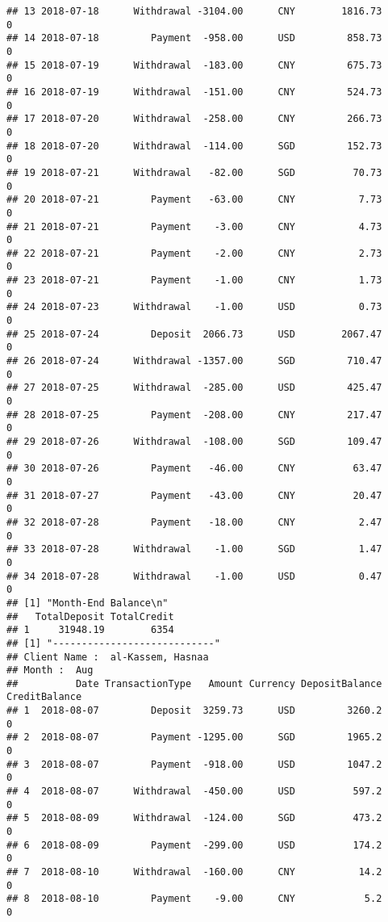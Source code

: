 \documentclass[]{article}
\begin{document}
\begin{verbatim}
## 13 2018-07-18      Withdrawal -3104.00      CNY        1816.73             0
## 14 2018-07-18         Payment  -958.00      USD         858.73             0
## 15 2018-07-19      Withdrawal  -183.00      CNY         675.73             0
## 16 2018-07-19      Withdrawal  -151.00      CNY         524.73             0
## 17 2018-07-20      Withdrawal  -258.00      CNY         266.73             0
## 18 2018-07-20      Withdrawal  -114.00      SGD         152.73             0
## 19 2018-07-21      Withdrawal   -82.00      SGD          70.73             0
## 20 2018-07-21         Payment   -63.00      CNY           7.73             0
## 21 2018-07-21         Payment    -3.00      CNY           4.73             0
## 22 2018-07-21         Payment    -2.00      CNY           2.73             0
## 23 2018-07-21         Payment    -1.00      CNY           1.73             0
## 24 2018-07-23      Withdrawal    -1.00      USD           0.73             0
## 25 2018-07-24         Deposit  2066.73      USD        2067.47             0
## 26 2018-07-24      Withdrawal -1357.00      SGD         710.47             0
## 27 2018-07-25      Withdrawal  -285.00      USD         425.47             0
## 28 2018-07-25         Payment  -208.00      CNY         217.47             0
## 29 2018-07-26      Withdrawal  -108.00      SGD         109.47             0
## 30 2018-07-26         Payment   -46.00      CNY          63.47             0
## 31 2018-07-27         Payment   -43.00      CNY          20.47             0
## 32 2018-07-28         Payment   -18.00      CNY           2.47             0
## 33 2018-07-28      Withdrawal    -1.00      SGD           1.47             0
## 34 2018-07-28      Withdrawal    -1.00      USD           0.47             0
## [1] "Month-End Balance\n"
##   TotalDeposit TotalCredit
## 1     31948.19        6354
## [1] "----------------------------"
## Client Name :  al-Kassem, Hasnaa 
## Month :  Aug 
##          Date TransactionType   Amount Currency DepositBalance CreditBalance
## 1  2018-08-07         Deposit  3259.73      USD         3260.2             0
## 2  2018-08-07         Payment -1295.00      SGD         1965.2             0
## 3  2018-08-07         Payment  -918.00      USD         1047.2             0
## 4  2018-08-07      Withdrawal  -450.00      USD          597.2             0
## 5  2018-08-09      Withdrawal  -124.00      SGD          473.2             0
## 6  2018-08-09         Payment  -299.00      USD          174.2             0
## 7  2018-08-10      Withdrawal  -160.00      CNY           14.2             0
## 8  2018-08-10         Payment    -9.00      CNY            5.2             0

\end{verbatim}
\end{document}
